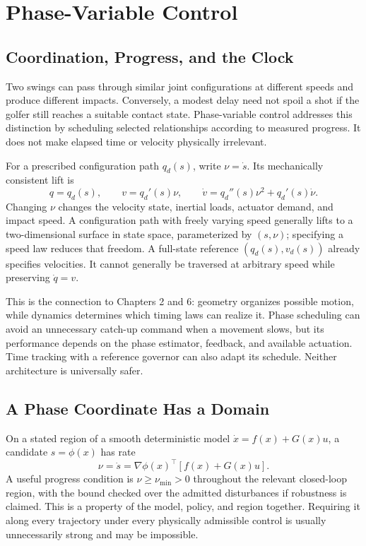 \documentclass[12pt, openany]{book}
\theoremstyle{plain}
\begin{document}
\setcounter{chapter}{7}

\chapter{Phase-Variable Control}
\label{ch:phase_variable_control}

\section{Coordination, Progress, and the Clock}

Two swings can pass through similar joint configurations at different speeds and produce different impacts. Conversely, a modest delay need not spoil a shot if the golfer still reaches a suitable contact state. Phase-variable control addresses this distinction by scheduling selected relationships according to measured progress. It does not make elapsed time or velocity physically irrelevant.

For a prescribed configuration path $q_d(s)$, write $\nu=\dot s$. Its mechanically consistent lift is
\begin{equation}
q=q_d(s),\qquad v=q_d'(s)\nu,\qquad
\dot v=q_d''(s)\nu^2+q_d'(s)\dot\nu .
\end{equation}
Changing $\nu$ changes the velocity state, inertial loads, actuator demand, and impact speed. A configuration path with freely varying speed generally lifts to a two-dimensional surface in state space, parameterized by $(s,\nu)$; specifying a speed law reduces that freedom. A full-state reference $(q_d(s),v_d(s))$ already specifies velocities. It cannot generally be traversed at arbitrary speed while preserving $\dot q=v$.

This is the connection to Chapters 2 and 6: geometry organizes possible motion, while dynamics determines which timing laws can realize it. Phase scheduling can avoid an unnecessary catch-up command when a movement slows, but its performance depends on the phase estimator, feedback, and available actuation. Time tracking with a reference governor can also adapt its schedule. Neither architecture is universally safer.

\section{A Phase Coordinate Has a Domain}

On a stated region of a smooth deterministic model $\dot x=f(x)+G(x)u$, a candidate $s=\phi(x)$ has rate
\begin{equation}
\nu=\dot s=\nabla\phi(x)^\top[f(x)+G(x)u].
\end{equation}
A useful progress condition is $\nu\geq\nu_{\min}>0$ throughout the relevant closed-loop region, with the bound checked over the admitted disturbances if robustness is claimed. This is a property of the model, policy, and region together. Requiring it along every trajectory under every physically admissible control is usually unnecessarily strong and may be impossible.
\end{document}
